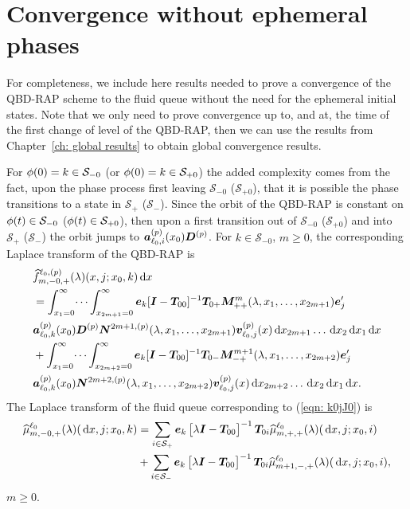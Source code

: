 \chapter{Convergence without ephemeral phases\label{app:extend conv}}
For completeness, we include here results needed to prove a convergence of the QBD-RAP scheme to the fluid queue without the need for the ephemeral initial states. Note that we only need to prove convergence up to, and at, the time of the first change of level of the QBD-RAP, then we can use the results from Chapter~\ref{ch: global results} to obtain global convergence results. 

For \(\phi(0)=k\in\mathcal S_{-0}\) (or \(\phi(0)=k\in\mathcal S_{+0}\)) the added complexity comes from the fact, upon the phase process first leaving \(\mathcal S_{-0}\) (\(\mathcal S_{+0}\)), that it is possible the phase transitions to a state in \(\mathcal S_+\) (\(\mathcal S_-\)). Since the orbit of the QBD-RAP is constant on \(\phi(t)\in\mathcal S_{-0}\) (\(\phi(t)\in\mathcal S_{+0}\)), then upon a first transition out of \(\mathcal S_{-0}\) (\(\mathcal S_{+0}\)) and into \(\mathcal S_+\) (\(\mathcal S_-\)) the orbit jumps to \(\boldsymbol   a_{\ell_0,i}^{(p)}(x_0)\boldsymbol D^{(p)}\). For \(k\in\mathcal S_{-0}\), \(m\geq 0\), the corresponding Laplace transform of the QBD-RAP is
\begin{align}
	&\widehat{f}_{m,-0,+}^{\ell_0,(p)}(\lambda)(x,j;x_0,k)\, \mathrm{d} x\nonumber 
	\\&=\int_{x_1=0}^\infty \dots \int_{x_{2m+1}=0}^\infty  \boldsymbol e_k [\boldsymbol I - \boldsymbol T_{00}]^{-1}\boldsymbol T_{0+}\boldsymbol M^m_{++}(\lambda,x_1,\dots,x_{2m+1})\boldsymbol e_j'{} \nonumber
	\\& \boldsymbol a_{\ell_0,k}^{(p)}(x_0) \boldsymbol D^{(p)} \boldsymbol N^{2m+1,(p)}(\lambda,x_1,\dots,x_{2m+1}) {\boldsymbol v}_{\ell_0,j}^{(p)}(x)\, \mathrm{d} x_{2m+1}\dots\, \mathrm{d} x_2 \, \mathrm{d} x_1 \, \mathrm{d} x \nonumber
	\\& + \int_{x_1=0}^\infty \dots \int_{x_{2m+2}=0}^\infty  \boldsymbol e_k [\boldsymbol I - \boldsymbol T_{00}]^{-1}\boldsymbol T_{0-}\boldsymbol M^{m+1}_{-+}(\lambda,x_1,\dots,x_{2m+2})\boldsymbol e_j'{} \nonumber
	\\& \boldsymbol a_{\ell_0,k}^{(p)}(x_0)\boldsymbol N^{2m+2,(p)}(\lambda,x_1,\dots,x_{2m+2}) {\boldsymbol v}_{\ell_0,j}^{(p)}(x)\, \mathrm{d} x_{2m+2}\dots\, \mathrm{d} x_2 \, \mathrm{d} x_1 \, \mathrm{d} x.
	\label{eqn: k0jJ0}
\end{align}
The Laplace transform of the fluid queue corresponding to (\ref{eqn: k0jJ0}) is 
\begin{align}  
	\widehat \mu_{m,-0,+}^{\ell_0}(\lambda)(\, \mathrm{d} x,j;x_0,k) \nonumber 
	&= \sum_{i\in\mathcal{S}_+}\boldsymbol e_k\begin{bmatrix} \lambda \boldsymbol I - \boldsymbol T_{00} \end{bmatrix}^{-1}\boldsymbol T_{0i}\widehat \mu_{m,+,+}^{\ell_0}(\lambda)(\, \mathrm{d} x,j;x_0,i) 
	\\&{}+ \sum_{i\in\mathcal{S}_-}\boldsymbol e_k\begin{bmatrix} \lambda \boldsymbol I - \boldsymbol T_{00} \end{bmatrix}^{-1}\boldsymbol T_{0i}\widehat \mu_{m+1,-,+}^{\ell_0}(\lambda)(\, \mathrm{d} x,j;x_0,i), \label{eqn: s0- actual}
\end{align}
\(m\geq 0\).

